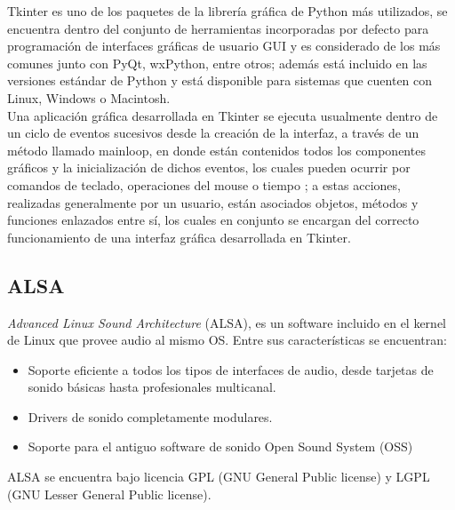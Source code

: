\documentclass[11pt,lettersize]{article} %
\begin{document}
Tkinter es uno de los paquetes de la librería gráfica de Python más utilizados, se encuentra dentro del conjunto de herramientas incorporadas por defecto para programación de interfaces gráficas de usuario GUI \cite{PythonTkinter} y es considerado de los más comunes junto con PyQt, wxPython, entre otros; además está incluido en las versiones estándar de Python y está disponible para sistemas que cuenten con Linux, Windows o Macintosh. \\

Una aplicación gráfica desarrollada en Tkinter se ejecuta usualmente dentro de un ciclo de eventos sucesivos desde la creación de la interfaz, a través de un método llamado mainloop, en donde están contenidos todos los componentes gráficos y la inicialización de dichos eventos, los cuales pueden ocurrir por comandos de teclado, operaciones del mouse o tiempo \cite{AnonimoTkinter}; a estas acciones, realizadas generalmente por un usuario, están asociados objetos, métodos y funciones enlazados entre sí, los cuales en conjunto se encargan del correcto funcionamiento de una interfaz gráfica desarrollada en Tkinter. 

%

\subsection{ALSA}
\label{S-alsa}

\textit{Advanced Linux Sound Architecture} (ALSA), es un software incluido en el kernel de Linux que provee audio al mismo OS. Entre sus características se encuentran:
\begin{itemize}[nolistsep]
	\item Soporte eficiente a todos los tipos de interfaces de audio, desde tarjetas de sonido básicas hasta profesionales multicanal.
	\item Drivers de sonido completamente modulares.
	\item Soporte para el antiguo software de sonido Open Sound System (OSS)
\end{itemize}
ALSA se encuentra bajo licencia GPL (GNU General Public license) y LGPL (GNU Lesser General Public license)\cite{Alsa}.
\end{document}
